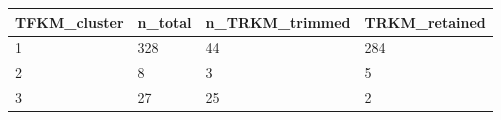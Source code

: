 \begin{tabular}{llll}
\toprule
TFKM\_cluster & n\_total & n\_TRKM\_trimmed & TRKM\_retained \\
\midrule
1 & 328 & 44 & 284 \\
2 & 8 & 3 & 5 \\
3 & 27 & 25 & 2 \\
\bottomrule
\end{tabular}
